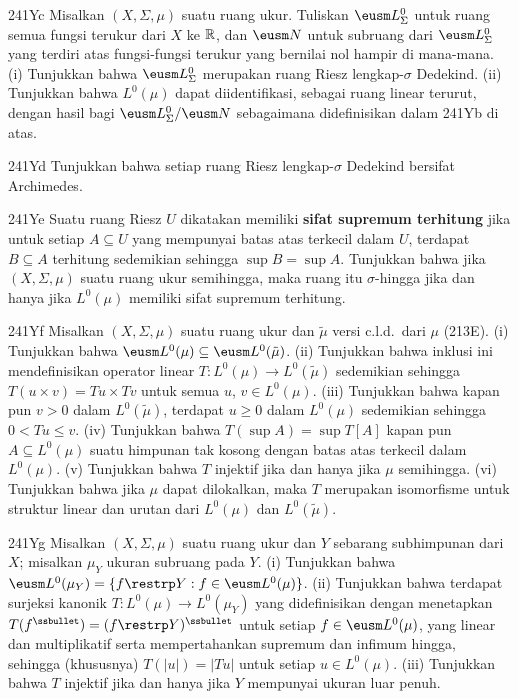 {\spheader 241Yc Misalkan $(X,\Sigma,\mu)$ suatu ruang ukur. Tuliskan
$\eusm L^0_{\Sigma}$ untuk ruang semua fungsi terukur dari $X$ ke
$\Bbb R$, dan $\eusm N$ untuk subruang dari $\eusm L^0_{\Sigma}$ yang
terdiri atas fungsi-fungsi terukur yang bernilai nol hampir di mana-mana.
(i) Tunjukkan bahwa $\eusm L^0_{\Sigma}$ merupakan ruang Riesz
lengkap-$\sigma$ Dedekind. (ii) Tunjukkan bahwa $L^0(\mu)$ dapat
diidentifikasi, sebagai ruang linear terurut, dengan hasil bagi
$\eusm L^0_{\Sigma}/\eusm N$ sebagaimana didefinisikan dalam 241Yb di
atas.

\spheader 241Yd Tunjukkan bahwa setiap ruang Riesz lengkap-$\sigma$
Dedekind bersifat Archimedes.

\spheader 241Ye Suatu ruang Riesz $U$ dikatakan memiliki
{\bf sifat supremum terhitung} jika untuk setiap $A\subseteq U$ yang
mempunyai batas atas terkecil dalam $U$, terdapat $B\subseteq A$
terhitung sedemikian sehingga $\sup B=\sup A$. Tunjukkan bahwa jika
$(X,\Sigma,\mu)$ suatu ruang ukur semihingga, maka ruang itu
$\sigma$-hingga jika dan hanya jika $L^0(\mu)$ memiliki sifat supremum terhitung.

\spheader 241Yf
Misalkan $(X,\Sigma,\mu)$ suatu ruang ukur dan $\tilde\mu$ versi c.l.d.\
dari $\mu$ (213E). (i) Tunjukkan bahwa
$\eusm L^0(\mu)\subseteq\eusm L^0(\tilde\mu)$. (ii) Tunjukkan bahwa
inklusi ini mendefinisikan operator linear
$T:L^0(\mu)\to L^0(\tilde\mu)$ sedemikian sehingga
$T(u\times v)=Tu\times Tv$ untuk semua $u$, $v\in L^0(\mu)$. (iii)
Tunjukkan bahwa kapan pun $v>0$ dalam $L^0(\tilde\mu)$, terdapat
$u\ge 0$ dalam $L^0(\mu)$ sedemikian sehingga $0<Tu\le v$. (iv)
Tunjukkan bahwa $T(\sup A)=\sup T[A]$ kapan pun
$A\subseteq L^0(\mu)$ suatu himpunan tak kosong dengan batas atas terkecil
dalam $L^0(\mu)$. (v) Tunjukkan bahwa $T$ injektif jika dan hanya jika $\mu$
semihingga. (vi) Tunjukkan bahwa jika $\mu$ dapat dilokalkan, maka $T$
merupakan isomorfisme untuk struktur linear dan urutan dari $L^0(\mu)$
dan $L^0(\tilde\mu)$. \Hint{213Hb.}

\spheader 241Yg Misalkan $(X,\Sigma,\mu)$ suatu ruang ukur dan $Y$
sebarang subhimpunan dari $X$; misalkan $\mu_Y$ ukuran subruang pada $Y$.
(i) Tunjukkan bahwa
$\eusm L^0(\mu_Y)=\{f\restrp Y:f\in\eusm L^0(\mu)\}$. (ii) Tunjukkan
bahwa terdapat surjeksi kanonik $T:L^0(\mu)\to L^0(\mu_Y)$ yang
didefinisikan dengan menetapkan
$T(f^{\ssbullet})=(f\restrp Y)^{\ssbullet}$ untuk setiap
$f\in\eusm L^0(\mu)$, yang linear dan multiplikatif serta mempertahankan
supremum dan infimum hingga, sehingga (khususnya) $T(|u|)=|Tu|$ untuk
setiap $u\in L^0(\mu)$. (iii) Tunjukkan bahwa $T$ injektif jika dan hanya jika $Y$
mempunyai ukuran luar penuh.

}
